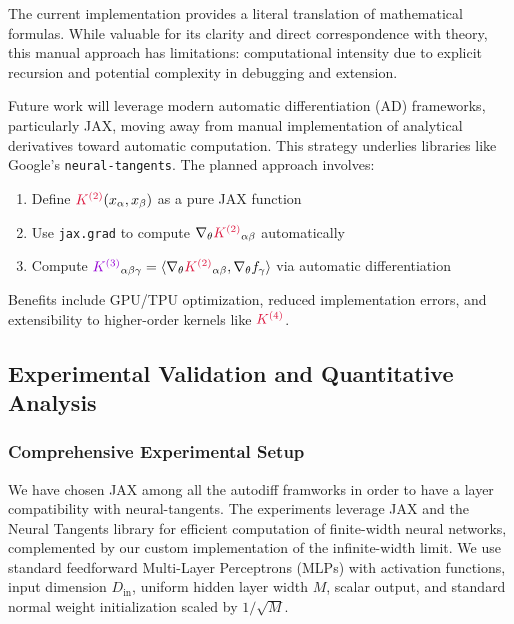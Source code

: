 \documentclass[a4paper]{article}
\DeclareRobustCommand{\ReLU}{\mathrel{\text{%
    \begin{tikzpicture}[baseline=(current bounding box.south)]
        \draw[thick] (0,0) -- (0.25,0) -- (0.4,0.25);
    \end{tikzpicture}}}\!\!}
\theoremstyle{plain}
\theoremstyle{definition}
\theoremstyle{remark}
\begin{document}
The current implementation provides a literal translation of mathematical formulas. While valuable for its clarity and direct correspondence with theory, this manual approach has limitations: computational intensity due to explicit recursion and potential complexity in debugging and extension.

Future work will leverage modern automatic differentiation (AD) frameworks, particularly JAX, moving away from manual implementation of analytical derivatives toward automatic computation. This strategy underlies libraries like Google's \texttt{neural-tangents}. The planned approach involves:

\begin{enumerate}
    \item Define $\textcolor{kernelcolor}{K^{(2)}}(x_\alpha, x_\beta)$ as a pure JAX function
    \item Use \texttt{jax.grad} to compute $\nabla_\theta \textcolor{kernelcolor}{K^{(2)}}_{\alpha\beta}$ automatically
    \item Compute $\textcolor{k3color}{K^{(3)}}_{\alpha\beta\gamma} = \langle \nabla_\theta \textcolor{kernelcolor}{K^{(2)}}_{\alpha\beta}, \nabla_\theta f_\gamma \rangle$ via automatic differentiation
\end{enumerate}

Benefits include GPU/TPU optimization, reduced implementation errors, and extensibility to higher-order kernels like $\textcolor{kernelcolor}{K^{(4)}}$.

\subsection{Experimental Validation and Quantitative Analysis}\label{sec:appendix_experimental_validation}

\subsubsection{Comprehensive Experimental Setup}
We have chosen JAX among all the autodiff framworks in order to have a layer compatibility with neural-tangents.
The experiments leverage JAX and the Neural Tangents library for efficient computation of finite-width neural networks, complemented by our custom implementation of the infinite-width limit. We use standard feedforward Multi-Layer Perceptrons (MLPs) with \ReLU activation functions, input dimension $D_{\text{in}}$, uniform hidden layer width $M$, scalar output, and standard normal weight initialization scaled by $1/\sqrt{M}$.
\end{document}
